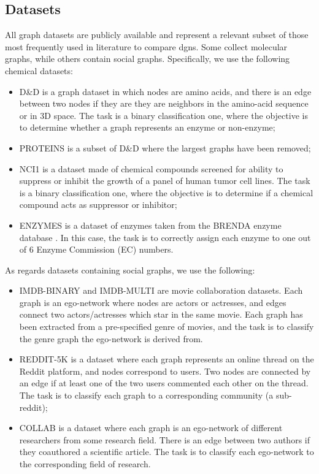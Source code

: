 \subsection{Datasets}
All  graph  datasets  are  publicly  available \citep{kersting2016benchmark}  and  represent  a  relevant subset of those most frequently used in literature to compare \glspl{dgn}. Some collect molecular graphs, while others contain social graphs. Specifically, we use the following chemical datasets:
\begin{itemize}
    \item D\&D \citep{dobson2003dd} is a graph dataset in which nodes are amino acids, and there is an edge between two nodes if they are they are neighbors in the amino-acid sequence or in 3D space. The task is a binary classification one, where the objective is to determine whether a graph represents an enzyme or non-enzyme;
    \item PROTEINS \citep{borgwardt2005proteins} is a subset of D\&D where the largest graphs have been removed;
    \item NCI1 \citep{wale2008nci1} is a dataset made of chemical compounds screened for ability to suppress or inhibit the growth of a panel of human tumor cell lines. The task is a binary classification one, where the objective is to determine if a chemical compound acts as suppressor or inhibitor;
    \item ENZYMES is a dataset of enzymes taken from the BRENDA enzyme database \citep{schomburg2004enzymes}. In this case, the task is to correctly assign each enzyme to one out of 6 Enzyme Commission (EC) numbers.
\end{itemize}
As regards datasets containing social graphs, we use the following:
\begin{itemize}
    \item IMDB-BINARY and IMDB-MULTI \citep{yanardag2015imdbredditcollab} are movie collaboration datasets. Each graph is an ego-network where nodes are actors or actresses, and edges connect two actors/actresses which star in the same movie. Each graph has been extracted from a pre-specified genre of movies, and the task is to classify the genre graph the ego-network is derived from.
    \item REDDIT-5K \citep{yanardag2015imdbredditcollab} is a dataset where each graph represents an online thread on the Reddit platform, and nodes correspond to users. Two nodes are connected by an edge if at least one of the two users commented each other on the thread. The task is to classify each graph to a corresponding community (a sub-reddit);
    \item COLLAB \citep{yanardag2015imdbredditcollab} is a dataset where each graph is an ego-network of different researchers from some research field. There is an edge between two authors if they coauthored a scientific article. The task is to classify each ego-network to the corresponding field of research.
\end{itemize}
